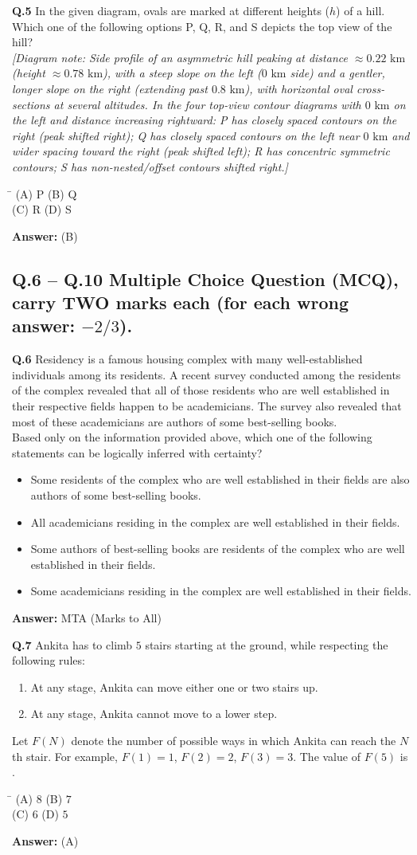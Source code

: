 \documentclass[11pt,a4paper]{article}
\newcommand{\optsfourA}[4]{%
  \begin{tabbing}
    \hspace{0.48\linewidth}\=\kill
    (A) #1 \> (B) #2 \\[2pt]
    (C) #3 \> (D) #4
  \end{tabbing}%
}
\newcommand{\optslistA}[4]{%
  \begin{itemize}
    \setlength{\itemsep}{2pt}\setlength{\parskip}{0pt}
    \item[(A)] #1
    \item[(B)] #2
    \item[(C)] #3
    \item[(D)] #4
  \end{itemize}%
}
\newcommand{\ans}[1]{\textbf{Answer:} #1\par\medskip}
\begin{document}
\textbf{Q.5} In the given diagram, ovals are marked at different heights ($h$) of a hill. Which one of the following options P, Q, R, and S depicts the top view of the hill?\\[4pt]
\emph{[Diagram note: Side profile of an asymmetric hill peaking at distance $\approx 0.22\text{ km}$ (height $\approx 0.78\text{ km}$), with a steep slope on the left ($0\text{ km}$ side) and a gentler, longer slope on the right (extending past $0.8\text{ km}$), with horizontal oval cross-sections at several altitudes. In the four top-view contour diagrams with $0\text{ km}$ on the left and distance increasing rightward: P has closely spaced contours on the right (peak shifted right); Q has closely spaced contours on the left near $0\text{ km}$ and wider spacing toward the right (peak shifted left); R has concentric symmetric contours; S has non-nested/offset contours shifted right.]}
\optsfourA{P}{Q}{R}{S}
\ans{(B)}

\subsection*{Q.6 -- Q.10 Multiple Choice Question (MCQ), carry TWO marks each (for each wrong answer: $-2/3$).}

\textbf{Q.6} Residency is a famous housing complex with many well-established individuals among its residents. A recent survey conducted among the residents of the complex revealed that all of those residents who are well established in their respective fields happen to be academicians. The survey also revealed that most of these academicians are authors of some best-selling books.\\
Based only on the information provided above, which one of the following statements can be logically inferred with certainty?
\optslistA{Some residents of the complex who are well established in their fields are also authors of some best-selling books.}{All academicians residing in the complex are well established in their fields.}{Some authors of best-selling books are residents of the complex who are well established in their fields.}{Some academicians residing in the complex are well established in their fields.}
\ans{MTA (Marks to All)}

\textbf{Q.7} Ankita has to climb $5$ stairs starting at the ground, while respecting the following rules:
\begin{enumerate}
  \setlength{\itemsep}{1pt}\setlength{\parskip}{0pt}
  \item At any stage, Ankita can move either one or two stairs up.
  \item At any stage, Ankita cannot move to a lower step.
\end{enumerate}
Let $F(N)$ denote the number of possible ways in which Ankita can reach the $N$th stair. For example, $F(1) = 1$, $F(2) = 2$, $F(3) = 3$. The value of $F(5)$ is \underline{\hspace{2cm}}.
\optsfourA{$8$}{$7$}{$6$}{$5$}
\ans{(A)}
\end{document}
